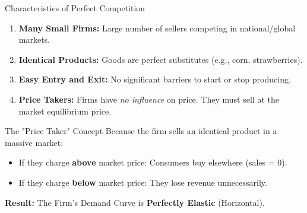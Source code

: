 \documentclass[aspectratio=169, 10pt]{beamer}
\begin{document}
\begin{frame}{Characteristics of Perfect Competition}
    \begin{enumerate}
        \item \textbf{Many Small Firms:} Large number of sellers competing in national/global markets.
        \item \textbf{Identical Products:} Goods are perfect substitutes (e.g., corn, strawberries).
        \item \textbf{Easy Entry and Exit:} No significant barriers to start or stop producing.
        \item \textbf{Price Takers:} Firms have \textit{no influence} on price. They must sell at the market equilibrium price.
    \end{enumerate}
\end{frame}

\begin{frame}{The "Price Taker" Concept}
    Because the firm sells an identical product in a massive market:
    \begin{itemize}
        \item If they charge \textbf{above} market price: Consumers buy elsewhere (sales = 0).
        \item If they charge \textbf{below} market price: They lose revenue unnecessarily.
    \end{itemize}
    \vspace{0.3cm}
    \textbf{Result:} The Firm's Demand Curve is \textbf{Perfectly Elastic} (Horizontal).
\end{frame}
\end{document}
